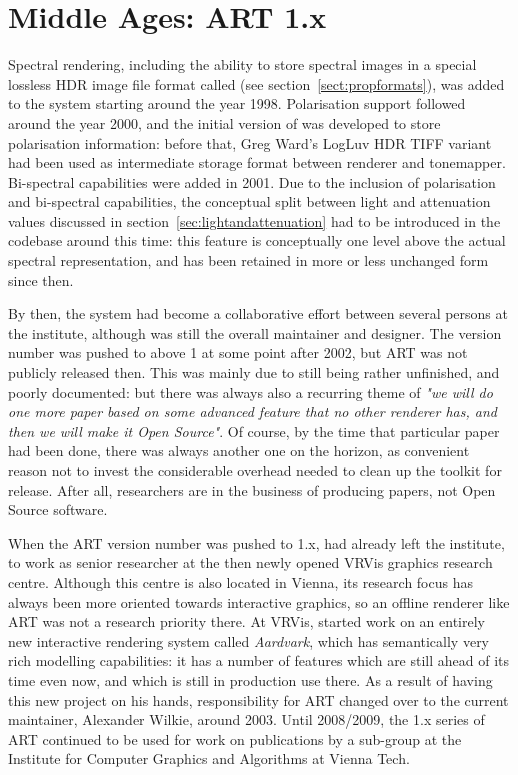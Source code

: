 \section{Middle Ages: ART 1.x}

Spectral rendering, including the ability to store spectral images in a special lossless HDR image file format called  (see section~\ref{sect:propformats}), was added to the system starting around the year 1998. Polarisation support followed around the year 2000, and the initial version of  was developed to store polarisation information: before that, Greg Ward's LogLuv HDR TIFF variant had been used as intermediate storage format between renderer and tonemapper. Bi-spectral capabilities were added in 2001. Due to the inclusion of polarisation and bi-spectral capabilities, the conceptual split between light and attenuation values discussed in section~\ref{sec:lightandattenuation} had to be introduced in the codebase around this time: this feature is conceptually one level above the actual spectral representation, and has been retained in more or less unchanged form since then.

By then, the system had become a collaborative effort between several persons at the institute, although  was still the overall maintainer and designer. The version number was pushed to above 1 at some point after 2002, but ART was not publicly released then. This was mainly due to still being rather unfinished, and poorly documented: but there was always also a recurring theme of \emph{"we will do one more paper based on some advanced feature that no other renderer has, and then we will make it Open Source"}. Of course, by the time that particular paper had been done, there was always another one on the horizon, as convenient reason not to invest the considerable overhead needed to clean up the toolkit for release. After all, researchers are in the business of producing papers, not Open Source software.

When the ART version number was pushed to 1.x,  had already left the institute, to work as senior researcher at the then newly opened VRVis graphics research centre. Although this centre is also located in Vienna, its research focus has always been more oriented towards interactive graphics, so an offline renderer like ART was not a research priority there. At VRVis,  started work on an entirely new interactive rendering system called \emph{Aardvark}, which has  semantically very rich modelling capabilities: it has a number of features which are still ahead of its time even now, and which is still in production use there. As a result of  having this new project on his hands, responsibility for ART changed over to the current maintainer, Alexander Wilkie, around 2003. Until 2008/2009, the 1.x series of ART continued to be used for work on publications by a sub-group at the Institute for Computer Graphics and Algorithms at Vienna Tech. 

